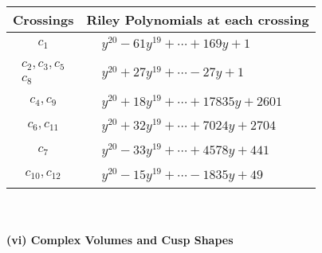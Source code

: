 \documentclass[1p]{elsarticle_modified}
\theoremstyle{definition}
\begin{document}
\begin{tabular}{m{50pt}|m{274pt}}
Crossings & \hspace{64pt}Riley Polynomials at each crossing \\
\hline $$\begin{aligned}c_{1}\end{aligned}$$&$\begin{aligned}
&y^{20}-61 y^{19}+\cdots+169 y+1
\end{aligned}$\\
\hline $$\begin{aligned}c_{2},c_{3},c_{5}\\c_{8}\end{aligned}$$&$\begin{aligned}
&y^{20}+27 y^{19}+\cdots-27 y+1
\end{aligned}$\\
\hline $$\begin{aligned}c_{4},c_{9}\end{aligned}$$&$\begin{aligned}
&y^{20}+18 y^{19}+\cdots+17835 y+2601
\end{aligned}$\\
\hline $$\begin{aligned}c_{6},c_{11}\end{aligned}$$&$\begin{aligned}
&y^{20}+32 y^{19}+\cdots+7024 y+2704
\end{aligned}$\\
\hline $$\begin{aligned}c_{7}\end{aligned}$$&$\begin{aligned}
&y^{20}-33 y^{19}+\cdots+4578 y+441
\end{aligned}$\\
\hline $$\begin{aligned}c_{10},c_{12}\end{aligned}$$&$\begin{aligned}
&y^{20}-15 y^{19}+\cdots-1835 y+49
\end{aligned}$\\
\hline
\end{tabular}\\~\\
\newpage\flushleft \textbf{(vi) Complex Volumes and Cusp Shapes}
\end{document}
